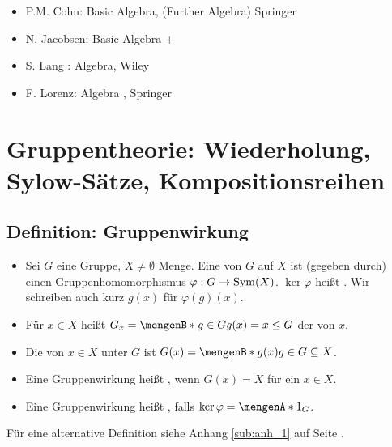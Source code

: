 
\newcommand{\fach}{Höhere Algebra \RM{1}}

\newcommand{\prof}{Prof.\,Dr.\,Dr.\,Katrin Tent}



\maketitle
{}

\tableofcontents
\cleardoubleoddemptypage

\setcounter{page}{1}


\begin{itemize}
	\item P.M. Cohn: Basic Algebra, (Further Algebra) Springer
	\item N. Jacobsen: Basic Algebra  + 
	\item S. Lang : Algebra, Wiley
	\item F. Lorenz: Algebra , Springer
\end{itemize}
\newpage

\section{Gruppentheorie: Wiederholung, Sylow-Sätze, Kompositionsreihen} %
\label{sec:1}

\subsection{Definition: Gruppenwirkung} %
\label{sub:11}
\begin{itemize}
	\item Sei $G$ eine Gruppe, $X \not= \emptyset$ Menge. Eine  von $G$ auf $X$ ist (gegeben durch) einen Gruppenhomomorphismus 
	$\varphi : G \to \operatorname{Sym}(X)$. $\ker \varphi$ heißt . Wir schreiben auch kurz $g(x)$ für $\varphi(g)(x)$.
	\item Für $x \in X$ heißt $G_x = \set[g \in G]{g(x) = x} \le G $ der  von $x$.
	\item Die  von $x \in X$ unter $G$ ist $G(x) = \set[g(x)]{g \in G} \subseteq X$. 
	\item Eine Gruppenwirkung heißt , wenn $G(x)=X$ für ein $x \in X$.
	\item Eine Gruppenwirkung heißt , falls $\ker \varphi = \set{1_G}$. 
\end{itemize}
Für eine alternative Definition siehe Anhang \ref{sub:anh_1} auf Seite \pageref{sub:anh_1}.

